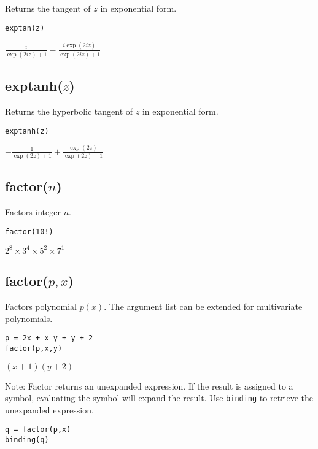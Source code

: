 Returns the tangent of $z$ in exponential form.

{\color{blue}
\begin{verbatim}
exptan(z)
\end{verbatim}
}

\noindent
$\displaystyle \frac{i}{\exp(2iz)+1}-\frac{i\exp(2iz)}{\exp(2iz)+1}$

\subsection*{exptanh($z$)}

Returns the hyperbolic tangent of $z$ in exponential form.

{\color{blue}
\begin{verbatim}
exptanh(z)
\end{verbatim}
}

\noindent
$\displaystyle -\frac{1}{\exp(2z)+1}+\frac{\exp(2z)}{\exp(2z)+1}$

\subsection*{factor($n$)}

Factors integer $n$.

{\color{blue}
\begin{verbatim}
factor(10!)
\end{verbatim}
}

\noindent
$\displaystyle 2^8\times 3^4\times 5^2\times 7^1$

\subsection*{factor($p,x$)}

Factors polynomial $p(x)$.
The argument list can be extended for multivariate polynomials.

{\color{blue}
\begin{verbatim}
p = 2x + x y + y + 2
factor(p,x,y)
\end{verbatim}
}

\noindent
$\displaystyle (x+1)(y+2)$

\bigskip
\noindent
Note: Factor returns an unexpanded expression.
If the result is assigned to a symbol, evaluating
the symbol will expand the result.
Use {\tt binding} to retrieve the unexpanded expression.

{\color{blue}
\begin{verbatim}
q = factor(p,x)
binding(q)
\end{verbatim}
}

